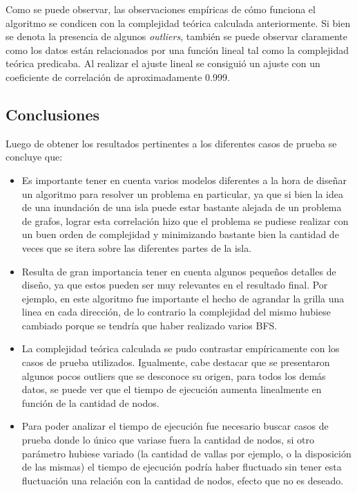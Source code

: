 \documentclass[a4paper, 12pt]{article}
\begin{document}
Como se puede observar, las observaciones empíricas de cómo funciona el algoritmo se condicen con la complejidad teórica
calculada anteriormente. Si bien se denota la presencia de algunos \emph{outliers}, también se puede observar claramente
como los datos están relacionados por una función lineal tal como la complejidad teórica predicaba. Al realizar el ajuste lineal
se consiguió un ajuste con un coeficiente de correlación de aproximadamente 0.999.

\subsection*{Conclusiones}
Luego de obtener los resultados pertinentes a los diferentes casos de prueba se concluye que:
\begin{itemize}
\item Es importante tener en cuenta varios modelos diferentes a la hora de dise\~{n}ar un algoritmo para resolver un problema
en particular, ya que si bien la idea de una inundación de una isla puede estar bastante alejada de un problema de grafos, lograr
esta correlación hizo que el problema se pudiese realizar con un buen orden de complejidad y minimizando bastante bien la cantidad de 
veces que se itera sobre las diferentes partes de la isla.
\item Resulta de gran importancia tener en cuenta algunos peque\~{n}os detalles de dise\~{n}o, ya que estos pueden ser muy
relevantes en el resultado final. Por ejemplo, en este algoritmo fue importante el hecho de agrandar la grilla una linea en cada dirección, 
de lo contrario la complejidad del mismo hubiese cambiado porque se tendría que haber realizado varios BFS.
\item La complejidad teórica calculada se pudo contrastar empíricamente con los casos de prueba utilizados. Igualmente, 
cabe destacar que se presentaron algunos pocos outliers que se desconoce su origen, para todos los demás datos, se puede ver que
el tiempo de ejecución aumenta linealmente en función de la cantidad de nodos.
\item Para poder analizar el tiempo de ejecución fue necesario buscar casos de prueba donde lo único que variase fuera la cantidad de nodos,
si otro parámetro hubiese variado (la cantidad de vallas por ejemplo, o la disposición de las mismas) el tiempo de ejecución 
podría haber fluctuado sin tener esta fluctuación una relación con la cantidad de nodos, efecto que no es deseado. 
\end{itemize}
\end{document}
